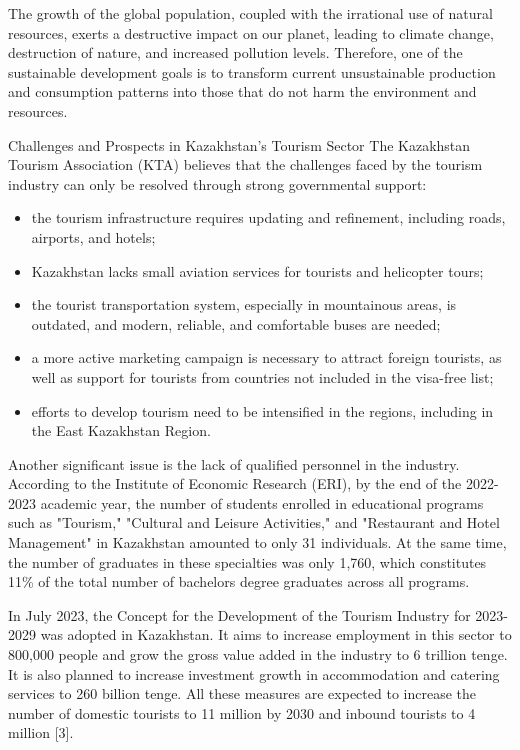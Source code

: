 \begin{multicols}{2}
The growth of the global population, coupled with the irrational use of
natural resources, exerts a destructive impact on our planet, leading to
climate change, destruction of nature, and increased pollution levels.
Therefore, one of the sustainable development goals is to transform
current unsustainable production and consumption patterns into those
that do not harm the environment and resources.

Challenges and Prospects in Kazakhstan's Tourism Sector The Kazakhstan
Tourism Association (KTA) believes that the challenges faced by the
tourism industry can only be resolved through strong governmental
support:

\begin{itemize}
\item
  the tourism infrastructure requires updating and refinement, including
  roads, airports, and hotels;
\item
  Kazakhstan lacks small aviation services for tourists and helicopter
  tours;
\item
  the tourist transportation system, especially in mountainous areas, is
  outdated, and modern, reliable, and comfortable buses are needed;
\item
  a more active marketing campaign is necessary to attract foreign
  tourists, as well as support for tourists from countries not included
  in the visa-free list;
\item
  efforts to develop tourism need to be intensified in the regions,
  including in the East Kazakhstan Region.
\end{itemize}

Another significant issue is the lack of qualified personnel in the
industry. According to the Institute of Economic Research (ERI), by the
end of the 2022-2023 academic year, the number of students enrolled in
educational programs such as "Tourism," "Cultural and Leisure
Activities," and "Restaurant and Hotel Management" in Kazakhstan
amounted to only 31 individuals. At the same time, the number of
graduates in these specialties was only 1,760, which constitutes 11\% of
the total number of bachelor\textquotesingle s degree graduates across
all programs.

In July 2023, the Concept for the Development of the Tourism Industry
for 2023-2029 was adopted in Kazakhstan. It aims to increase employment
in this sector to 800,000 people and grow the gross value added in the
industry to 6 trillion tenge. It is also planned to increase investment
growth in accommodation and catering services to 260 billion tenge. All
these measures are expected to increase the number of domestic tourists
to 11 million by 2030 and inbound tourists to 4 million {[}3{]}.


\end{multicols}
